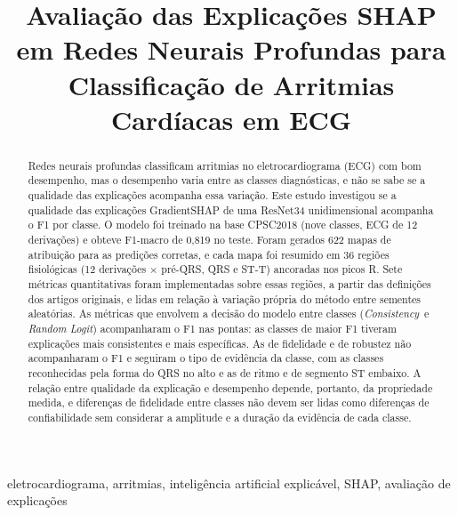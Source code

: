 \documentclass[conference]{IEEEtran}
\newcommand{\CS}{\textit{Consistency}}
\newcommand{\RL}{\textit{Random Logit}}
\begin{document}
\title{Avaliação das Explicações SHAP em Redes Neurais Profundas para Classificação de Arritmias Cardíacas em ECG}

\author{
\and
{}
}

\maketitle

\begin{abstract}
Redes neurais profundas classificam arritmias no eletrocardiograma (ECG) com bom desempenho, mas o desempenho varia entre as classes diagnósticas, e não se sabe se a qualidade das explicações acompanha essa variação. Este estudo investigou se a qualidade das explicações GradientSHAP de uma ResNet34 unidimensional acompanha o F1 por classe. O modelo foi treinado na base CPSC2018 (nove classes, ECG de 12 derivações) e obteve F1-macro de 0,819 no teste. Foram gerados 622 mapas de atribuição para as predições corretas, e cada mapa foi resumido em 36 regiões fisiológicas (12 derivações × pré-QRS, QRS e ST-T) ancoradas nos picos R. Sete métricas quantitativas foram implementadas sobre essas regiões, a partir das definições dos artigos originais, e lidas em relação à variação própria do método entre sementes aleatórias. As métricas que envolvem a decisão do modelo entre classes (\CS\ e \RL) acompanharam o F1 nas pontas: as classes de maior F1 tiveram explicações mais consistentes e mais específicas. As de fidelidade e de robustez não acompanharam o F1 e seguiram o tipo de evidência da classe, com as classes reconhecidas pela forma do QRS no alto e as de ritmo e de segmento ST embaixo. A relação entre qualidade da explicação e desempenho depende, portanto, da propriedade medida, e diferenças de fidelidade entre classes não devem ser lidas como diferenças de confiabilidade sem considerar a amplitude e a duração da evidência de cada classe.
\end{abstract}

\begin{IEEEkeywords}
eletrocardiograma, arritmias, inteligência artificial explicável, SHAP, avaliação de explicações
\end{IEEEkeywords}



\FloatBarrier

\clearpage\twocolumn





\end{document}
